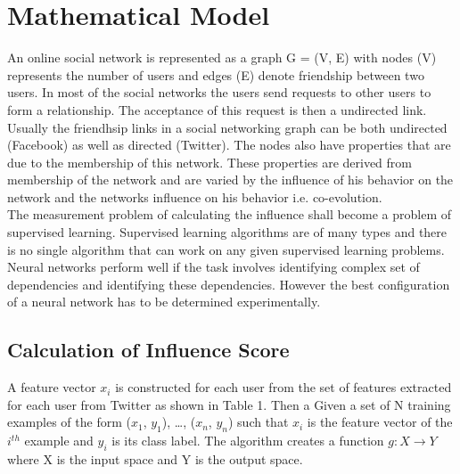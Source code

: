
\section{Mathematical Model}
An online social network is represented as a graph G = (V, E) with nodes (V) represents the number of users and edges (E) denote friendship between two users. In most of the social networks the users send requests to other users to form a relationship. The acceptance of this request is then a undirected link. Usually the friendhsip links in a social networking graph can be both undirected (Facebook) as well as directed (Twitter). The nodes also have properties that are due to the membership of this network. These properties are derived from membership of the network and are varied by the influence of his behavior on the network and the networks influence on his behavior i.e. co-evolution.  \\

The measurement problem of calculating the influence shall become a problem of supervised learning. Supervised learning algorithms are of many types and there is no single algorithm that can work on any given supervised learning problems. Neural networks perform well if the task involves identifying complex set of dependencies and identifying these dependencies. However the best configuration of a neural network has to be determined experimentally.\\


\subsection{Calculation of Influence Score}
A feature vector $x_i$ is constructed for each user from the set of features extracted for each user from Twitter as shown in Table 1. Then a Given a set of N training examples of the form {($x_1$, $y_1$), …, ($x_n$, $y_n$)} such that $x_i$ is the feature vector of the $i^{th}$ example and $y_i$ is its class label. The algorithm creates a function $g: X \rightarrow Y$ where X is the input space and Y is the output space.

